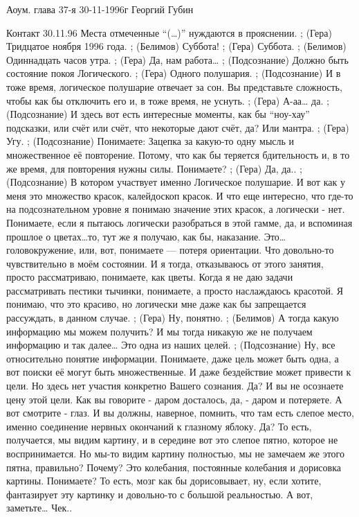 Аоум. глава 37-я 30-11-1996г
Георгий Губин
 
Контакт 30.11.96
Места отмеченные ``(…)'' 
нуждаются в прояснении. 
;	(Гера) Тридцатое ноября 1996 года.
;	(Белимов) Суббота!
;	(Гера) Суббота.
;	(Белимов) Одиннадцать часов утра.
;	(Гера) Да, нам работа…
;	(Подсознание) Должно быть состояние покоя Логического.
;	(Гера) Одного полушария.
;	(Подсознание) И в тоже время, логическое полушарие отвечает за сон. Вы представьте сложность, чтобы как бы отключить его и, в тоже время, не уснуть.
;	(Гера) А-аа… да.
;	(Подсознание) И здесь вот есть интересные моменты, как бы ``ноу-хау'' подсказки, или счёт или счёт, что некоторые дают счёт, да? Или мантра.
;	(Гера) Угу.
;	(Подсознание) Понимаете: Зацепка за какую-то одну мысль и множественное её повторение. Потому, что как бы теряется бдительность и, в то же время, для повторения нужны силы. Понимаете?
;	(Гера) Да, да..
;	(Подсознание) В котором участвует именно Логическое полушарие. И вот как у меня это множество красок, калейдоскоп красок. И что еще интересно, что где-то на подсознательном уровне я понимаю значение этих красок, а логически - нет. Понимаете, если я пытаюсь логически разобраться в этой гамме, да, и вспоминая прошлое о цветах…то, тут же я получаю,  как бы, наказание. Это… головокружение, или, вот, понимаете — потеря ориентации. Что довольно-то чувствительно в моём состоянии. И я тогда, отказываюсь от этого занятия, просто рассматриваю, понимаете, как цветы. Когда я не даю задачи рассматривать пестики тычинки, понимаете, а просто наслаждаюсь красотой. Я понимаю, что это красиво, но логически мне даже как бы запрещается рассуждать, в данном случае.
;	(Гера) Ну, понятно.
;	(Белимов) А тогда какую информацию мы можем получить? И мы тогда никакую же не получаем информацию и так далее… Это одна из наших целей.  
;	(Подсознание) Ну, все относительно понятие информации. Понимаете, даже  цель может быть одна, а вот поиски её могут быть множественные. И даже бездействие может привести к цели. Но здесь нет участия конкретно Вашего сознания. Да? И вы не осознаете цену этой цели. Как вы говорите - даром досталось, да,  - даром и потеряете. А вот смотрите - глаз. И вы должны, наверное, помнить, что там есть слепое место, именно соединение нервных окончаний к глазному яблоку. Да? То есть, получается, мы видим картину, и в середине вот это слепое пятно, которое не воспринимается. Но мы-то видим картину полностью, мы не замечаем же этого пятна, правильно? Почему? Это колебания, постоянные колебания и дорисовка картины. Понимаете? То есть, мозг как бы дорисовывает, ну, если хотите,  фантазирует эту картинку и довольно-то с большой реальностью. А вот, заметьте… Чек..
